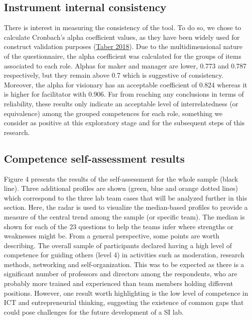 \documentclass[AMA,STIX1COL,APA,STIX2COL]{WileyNJD-v2}
\begin{document}
\hypertarget{instrument-internal-consistency}{%
\subsection{Instrument internal
consistency}\label{instrument-internal-consistency}}

There is interest in measuring the consistency of the tool. To do so, we
chose to calculate Cronbach's alpha coefficient values, as they have
been widely used for construct validation purposes
(\protect\hyperlink{ref-Taber2018}{Taber 2018}). Due to the
multidimensional nature of the questionnaire, the alpha coefficient was
calculated for the groups of items associated to each role. Alphas for
maker and manager are lower, 0.773 and 0.787 respectively, but they
remain above 0.7 which is suggestive of consistency. Moreover, the alpha
for visionary has an acceptable coefficient of 0.824 whereas it is
higher for facilitator with 0.906. Far from reaching any conclusions in
terms of reliability, these results only indicate an acceptable level of
interrelatedness (or equivalence) among the grouped competences for each
role, something we consider as positive at this exploratory stage and
for the subsequent steps of this research.

\hypertarget{competence-self-assessment-results}{%
\subsection{Competence self-assessment
results}\label{competence-self-assessment-results}}

Figure 4 presents the results of the self-assessment for the whole
sample (black line). Three additional profiles are shown (green, blue
and orange dotted lines) which correspond to the three lab team cases
that will be analyzed further in this section. Here, the radar is used
to visualize the median-based profiles to provide a measure of the
central trend among the sample (or specific team). The median is shown
for each of the 23 questions to help the teams infer where strengths or
weaknesses might be. From a general perspective, some points are worth
describing. The overall sample of participants declared having a high
level of competence for guiding others (level 4) in activities such as
moderation, research methods, networking and self-organization. This was
to be expected as there is a significant number of professors and
directors among the respondents, who are probably more trained and
experienced than team members holding different positions. However, one
result worth highlighting is the low level of competence in ICT and
entrepreneurial thinking, suggesting the existence of common gaps that
could pose challenges for the future development of a SI lab.
\end{document}

